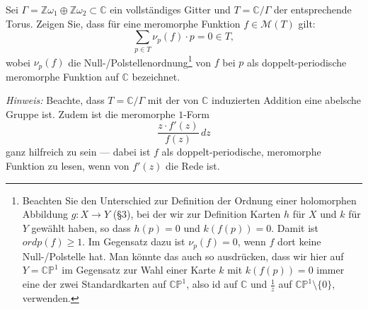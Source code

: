 \documentclass[a4paper,11pt]{article}
\newcounter{aufg}
\newcommand{\Aufg}{\stepcounter{aufg}\vspace*{0.2cm}\noindent{\bf
    Aufgabe \arabic{aufg}:} }
\begin{document}
\Aufg Sei $\Gamma=\mathbb{Z}\omega_1\oplus\mathbb{Z}\omega_2\subset\mathbb{C}$ ein vollständiges Gitter und $T=\mathbb{C}/\Gamma$ der entsprechende Torus. Zeigen Sie, dass für eine meromorphe Funktion $f\in\mathcal{M}(T)$ gilt:
\[
\sum_{p\in T} \nu_p(f)\cdot p = 0 \in T,
\]
wobei \(\nu_p(f)\) die Null-/Polstellenordnung\footnote{Beachten Sie den Unterschied zur Definition der Ordnung einer holomorphen Abbildung $g:X\rightarrow Y$ (§3), bei der wir zur Definition	Karten $h$ für $X$ und $k$ für $Y$ gewählt haben, so dass $h(p) = 0$ und $k(f(p)) = 0$. Damit ist $ordp(f) \geq 1$. Im Gegensatz dazu ist $\nu_p(f) = 0$, wenn $f$ dort keine Null-/Polstelle hat. Man könnte das auch so ausdrücken, dass wir hier auf $Y = \mathbb{CP}^1$ im Gegensatz zur Wahl einer Karte $k$ mit $k(f(p)) = 0$ immer eine der zwei Standardkarten auf $\mathbb{CP}^1$, also id auf $\mathbb{C}$ und $\frac{1}{z}$ auf $\mathbb{CP}^1 \setminus \{ 0 \}$, verwenden.} von \(f\) bei \(p\) als doppelt-periodische meromorphe Funktion auf \(\mathbb{C}\) bezeichnet. 

\emph{Hinweis:} Beachte, dass $T=\mathbb{C}/\Gamma$ mit der von $\mathbb{C}$ induzierten Addition eine abelsche Gruppe ist. Zudem ist die meromorphe $1$-Form
\[
\frac{z\cdot f'(z)}{f(z)}\,dz
\]
ganz hilfreich zu sein — dabei ist \(f\) als doppelt-periodische, meromorphe Funktion zu lesen, wenn von \(f'(z)\) die Rede ist.
\end{document}
